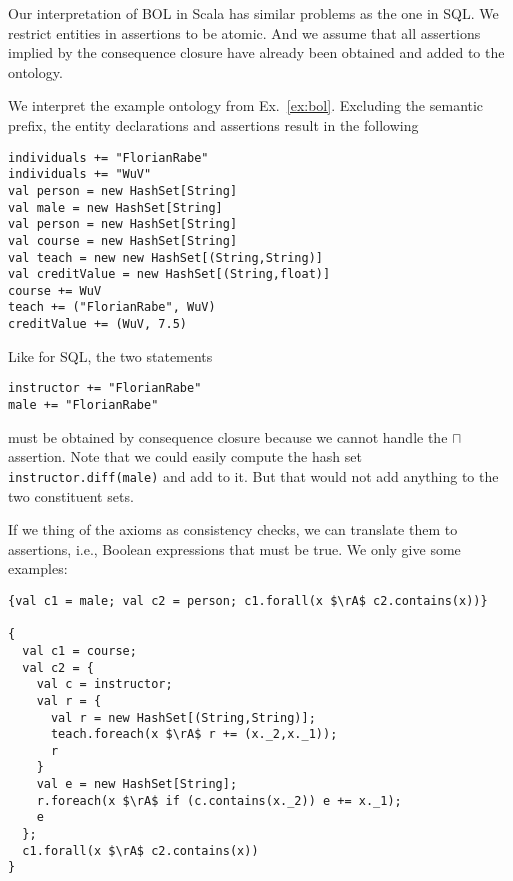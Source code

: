 \begin{remark}[Limitations]
Our interpretation of BOL in Scala has similar problems as the one in SQL.
We restrict entities in assertions to be atomic.
And we assume that all assertions implied by the consequence closure have already been obtained and added to the ontology.
\end{remark}

\begin{example}
We interpret the example ontology from Ex.~\ref{ex:bol}.
Excluding the semantic prefix, the entity declarations and assertions result in the following
\begin{lstlisting}
individuals += "FlorianRabe"
individuals += "WuV"
val person = new HashSet[String]
val male = new HashSet[String]
val person = new HashSet[String]
val course = new HashSet[String]
val teach = new new HashSet[(String,String)]
val creditValue = new HashSet[(String,float)]
course += WuV
teach += ("FlorianRabe", WuV)
creditValue += (WuV, 7.5)
\end{lstlisting}

Like for SQL, the two statements
\begin{lstlisting}
instructor += "FlorianRabe"
male += "FlorianRabe"
\end{lstlisting}
must be obtained by consequence closure because we cannot handle the $\sqcap$ assertion.
Note that we could easily compute the hash set \verb|instructor.diff(male)| and add to it.
But that would not add anything to the two constituent sets.

If we thing of the axioms as consistency checks, we can translate them to assertions, i.e., Boolean expressions that must be true.
We only give some examples:
\begin{lstlisting}
{val c1 = male; val c2 = person; c1.forall(x $\rA$ c2.contains(x))}

{
  val c1 = course;
  val c2 = {
    val c = instructor;
    val r = {
      val r = new HashSet[(String,String)];
      teach.foreach(x $\rA$ r += (x._2,x._1));
      r
    }
    val e = new HashSet[String];
    r.foreach(x $\rA$ if (c.contains(x._2)) e += x._1);
    e
  };
  c1.forall(x $\rA$ c2.contains(x))
}
\end{lstlisting}


\end{example}

